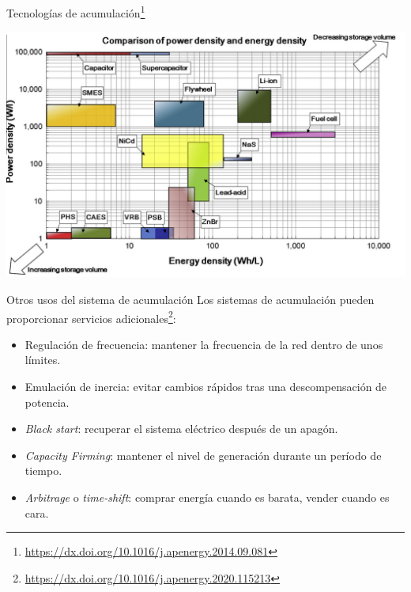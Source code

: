 \documentclass[aspectratio=169, usenames,svgnames,dvipsnames]{beamer}
\begin{document}
\begin{frame}[label={sec:org3c6be95}]{Tecnologías de acumulación\footnote{\url{https://dx.doi.org/10.1016/j.apenergy.2014.09.081}}}
\begin{center}
\includegraphics[height=0.8\textheight]{../figs/SistemasAcumulacion_DensidadPotenciaEnergia.png}
\end{center}
\end{frame}

\begin{frame}[label={sec:orga5f7c44}]{Otros usos del sistema de acumulación}
Los sistemas de acumulación pueden proporcionar servicios adicionales\footnote{\url{https://dx.doi.org/10.1016/j.apenergy.2020.115213}}:

\begin{itemize}
\item \alert{Regulación de frecuencia}: mantener la frecuencia de la red dentro de unos límites.
\item \alert{Emulación de inercia}: evitar cambios rápidos tras una descompensación de potencia.
\item \alert{\emph{Black start}}: recuperar el sistema eléctrico después de un apagón.
\item \alert{\emph{Capacity Firming}}: mantener el nivel de generación durante un período de tiempo.
\item \alert{\emph{Arbitrage}} o \emph{time-shift}: comprar energía cuando es barata, vender cuando es cara.
\end{itemize}
\end{frame}
\end{document}
